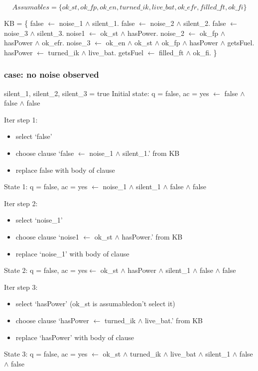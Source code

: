 \documentclass[]{article}
\begin{document}
  \[Assumables = \{ok\_st, ok\_fp, ok\_en, turned\_ik, live\_bat, ok\_efr,
  filled\_ft, ok\_fi\} \]

  KB = \{ 
  false $\leftarrow$ noise\_1 $\wedge$ silent\_1. \newline
  false $\leftarrow$ noise\_2 $\wedge$ silent\_2. \newline
  false $\leftarrow$ noise\_3 $\wedge$ silent\_3. \newline
  noise1 $\leftarrow$ ok\_st $\wedge$ hasPower. \newline
  noise\_2 $\leftarrow$ ok\_fp $\wedge$ hasPower $\wedge$ ok\_efr. \newline
  noise\_3 $\leftarrow$ ok\_en $\wedge$ ok\_st $\wedge$ ok\_fp $\wedge$ hasPower $\wedge$ getsFuel. \newline
  hasPower $\leftarrow$ turned\_ik $\wedge$ live\_bat. \newline
  getsFuel $\leftarrow$ filled\_ft $\wedge$ ok\_fi. \}

\subsubsection{case: no noise observed}
silent\_1, silent\_2, silent\_3 = true \newline
Initial state: q = false, ac = yes $\leftarrow$ false $\wedge$ false $\wedge$ false \newline

Iter step 1: 
\begin{itemize}
\item select `false' 
\item choose clause `false $\leftarrow$ noise\_1 $\wedge$ silent\_1.' from KB 
\item replace false with body of clause 
\end{itemize}
State 1: q = false, ac = yes $\leftarrow$ noise\_1 $\wedge$ silent\_1 $\wedge$ false $\wedge$ false \newline

Iter step 2: 
\begin{itemize}
\item select `noise\_1'
\item choose clause `noise1 $\leftarrow$ ok\_st $\wedge$ hasPower.' from KB
\item replace `noise\_1' with body of clause 
\end{itemize}
State 2: q = false, ac = yes$\leftarrow$ ok\_st $\wedge$ hasPower $\wedge$ silent\_1 $\wedge$ false $\wedge$ false 

Iter step 3: 
\begin{itemize}
  \item select `hasPower' (ok\_st is assumabledon't select it) 
\item choose clause `hasPower $\leftarrow$ turned\_ik $\wedge$ live\_bat.' from KB 
\item replace `hasPower' with body of clause
\end{itemize}
State 3: q = false, ac = yes $\leftarrow$ ok\_st $\wedge$ turned\_ik $\wedge$ live\_bat $\wedge$ silent\_1 $\wedge$ false $\wedge$ false 
\end{document}

